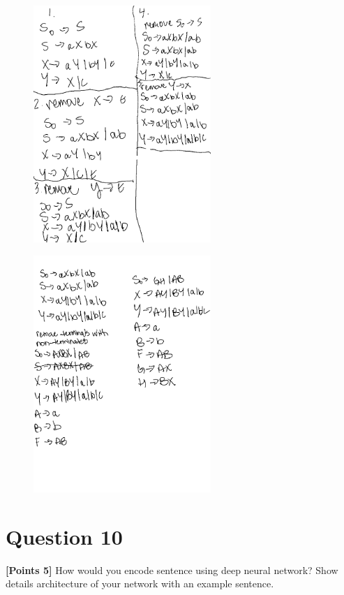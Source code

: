 \documentclass[12pt]{article}
\begin{document}
\begin{figure}[!ht]
      \centering
      \includegraphics[width=0.6\textwidth]{assets/test2/p9a.png}
\end{figure}
\newpage

\begin{figure}[!ht]
      \centering
      \includegraphics[width=0.6\textwidth]{assets/test2/p9b.png}
\end{figure}

\newpage
\section*{Question 10}
\textbf{[Points 5]} How would you encode sentence using deep neural network?
Show details architecture of your network with an example sentence.
\end{document}
